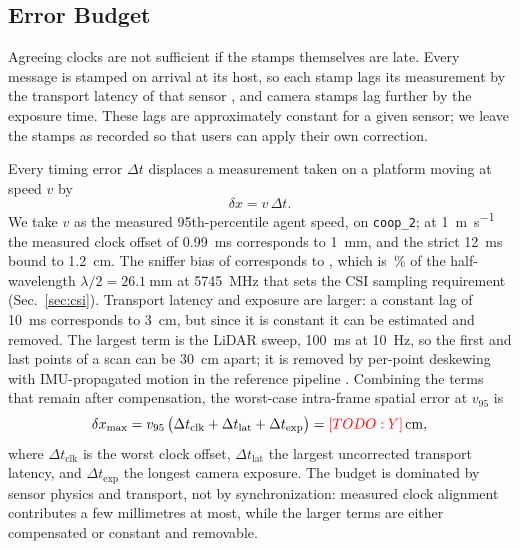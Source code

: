 \subsection{Error Budget}
\label{sec:budget}
Agreeing clocks are not sufficient if the stamps themselves are late.
Every message is stamped on arrival at its host, so each stamp lags
its measurement by the transport latency of that sensor
, and camera stamps lag further by the exposure time.
These lags are approximately constant for a given sensor; we leave the
stamps as recorded so that users can apply their own correction.

Every timing error $\Delta t$ displaces a measurement taken on a
platform moving at speed $v$ by
\begin{equation}
  \delta x = v \, \Delta t .
  \label{eq:time_bound}
\end{equation}
We take $v$ as the measured 95th-percentile agent speed,
 on \texttt{coop\_2}; at \SI{1}{\metre\per\second} the
measured clock offset of \SI{0.99}{\milli\second} corresponds to
\SI{1}{\milli\metre}, and the strict \SI{12}{\milli\second} bound to
\SI{1.2}{\centi\metre}. The sniffer bias of \todo{} corresponds
to \todo{}, which is \todo{}\,\% of the half-wavelength
$\lambda/2 = \SI{26.1}{\milli\metre}$ at \SI{5745}{\mega\hertz} that
sets the CSI sampling requirement (Sec.~\ref{sec:csi}). Transport
latency and exposure are larger: a constant lag of
\SI{10}{\milli\second} corresponds to \SI{3}{\centi\metre}, but since
it is constant it can be estimated and removed. The largest term is
the LiDAR sweep, \SI{100}{\milli\second} at \SI{10}{\hertz}, so the
first and last points of a scan can be \SI{30}{\centi\metre} apart;
it is removed by per-point deskewing with IMU-propagated motion in the
reference pipeline \cite{glim}. Combining the terms that remain after
compensation, the worst-case intra-frame spatial error at $v_{95}$ is
\begin{equation}
  \delta x_{\max} = v_{95}\,\big(\Delta t_{\mathrm{clk}}
  + \Delta t_{\mathrm{lat}} + \Delta t_{\mathrm{exp}}\big)
  = \textcolor{red}{[TODO: Y]}\,\si{\centi\metre},
  \label{eq:fusion_bound}
\end{equation}
where $\Delta t_{\mathrm{clk}}$ is the worst clock offset,
$\Delta t_{\mathrm{lat}}$ the largest uncorrected transport latency,
and $\Delta t_{\mathrm{exp}}$ the longest camera exposure. The budget
is dominated by sensor physics and transport, not by synchronization:
measured clock alignment contributes a few millimetres at most, while
the larger terms are either compensated or constant and removable. 

